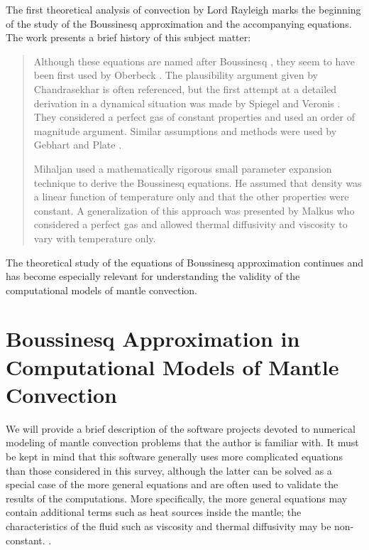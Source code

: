 The first theoretical analysis of convection by Lord Rayleigh marks the beginning of the study of the Boussinesq approximation and the accompanying equations. The work \cite[p. 545]{boussinesq_validity} presents a brief history of this subject matter:

\begin{quote}

Although these equations are named after Boussinesq \cite{boussinesq_article}, they seem to have been first used by Oberbeck \cite{oberbeck}. The plausibility argument given by Chandrasekhar \cite{chandrasekhar} is often referenced, but the first attempt at a detailed derivation in a dynamical situation was made by Spiegel and Veronis \cite{spiegel_and_veronis}. They considered a perfect gas of constant properties and used an order of magnitude argument. Similar assumptions and methods were used by Gebhart \cite{gebhart} and Plate \cite{plate}.

Mihaljan \cite{mihaljan} used a mathematically  rigorous small parameter expansion technique to derive the Boussinesq equations. He assumed that density was a linear function of temperature only and that the other properties were constant. A generalization of this approach was presented by Malkus \cite{malkus1, malkus2} who considered a perfect gas and allowed thermal diffusivity and viscosity to vary with temperature only.
 
\end{quote}

The theoretical study of the equations of Boussinesq approximation continues and has become especially relevant for understanding the validity of the computational models of mantle convection.

\section{Boussinesq Approximation in Computational Models of Mantle Convection}

We will provide a brief description of the software projects devoted to numerical modeling of mantle convection problems that the author is familiar with. It must be kept in mind that this software generally uses more complicated equations than those considered in this survey, although the latter can be solved as a special case of the more general equations and are often used to validate the results of the computations. More specifically, the more general equations may contain additional terms such as heat sources inside the mantle; the characteristics of the fluid such as viscosity and thermal diffusivity may be non-constant. \cite[p. 13]{aspect}.

